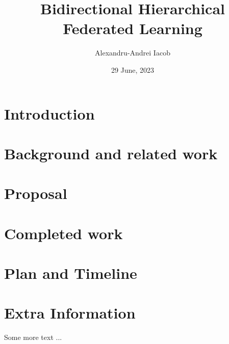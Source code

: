 \documentclass[times, withindex,glossary, backrefs, firstyr]{cam-thesis}
\title{Bidirectional Hierarchical Federated Learning}
\author{Alexandru-Andrei Iacob}
\date{29 June, 2023}
\begin{document}
\frontmatter{}



\chapter{Introduction}

\chapter{Background and related work}

\chapter{Proposal}

\chapter{Completed work}

\chapter{Plan and Timeline}



\renewcommand{\bibname}{References}
\cleardoublepage
{}
{}






\appendix

\chapter{Extra Information}
Some more text ...



\printthesisindex
\end{document}
